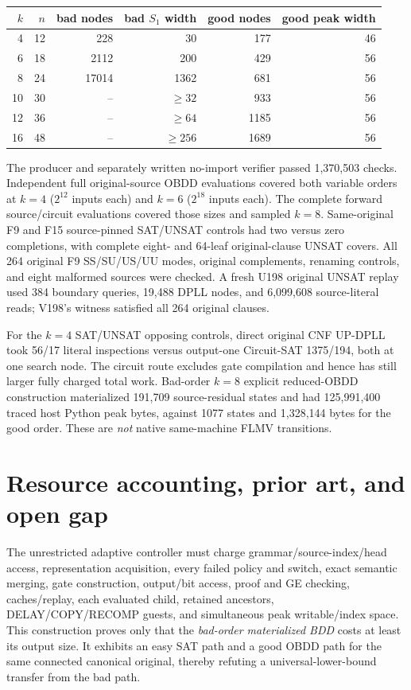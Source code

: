 \documentclass[11pt]{article}
\begin{document}
\begin{center}\begin{tabular}{rrrrrr}\toprule
$k$ & $n$ & bad nodes & bad $S_1$ width & good nodes & good peak width\\\midrule
4&12&228&30&177&46\\
6&18&2112&200&429&56\\
8&24&17014&1362&681&56\\
10&30&--&$\ge32$&933&56\\
12&36&--&$\ge64$&1185&56\\
16&48&--&$\ge256$&1689&56\\\bottomrule
\end{tabular}\end{center}

The producer and separately written no-import verifier passed 1,370,503 checks. Independent full original-source OBDD evaluations covered both variable orders at $k=4$ ($2^{12}$ inputs each) and $k=6$ ($2^{18}$ inputs each). The complete forward source/circuit evaluations covered those sizes and sampled $k=8$. Same-original F9 and F15 source-pinned SAT/UNSAT controls had two versus zero completions, with complete eight- and 64-leaf original-clause UNSAT covers. All 264 original F9 SS/SU/US/UU modes, original complements, renaming controls, and eight malformed sources were checked. A fresh U198 original UNSAT replay used 384 boundary queries, 19,488 DPLL nodes, and 6,099,608 source-literal reads; V198's witness satisfied all 264 original clauses.

For the $k=4$ SAT/UNSAT opposing controls, direct original CNF UP-DPLL took 56/17 literal inspections versus output-one Circuit-SAT 1375/194, both at one search node. The circuit route excludes gate compilation and hence has still larger fully charged total work. Bad-order $k=8$ explicit reduced-OBDD construction materialized 191,709 source-residual states and had 125,991,400 traced host Python peak bytes, against 1077 states and 1,328,144 bytes for the good order. These are \emph{not} native same-machine FLMV transitions.

\section{Resource accounting, prior art, and open gap}
The unrestricted adaptive controller must charge grammar/source-index/head access, representation acquisition, every failed policy and switch, exact semantic merging, gate construction, output/bit access, proof and GE checking, caches/replay, each evaluated child, retained ancestors, DELAY/COPY/RECOMP guests, and simultaneous peak writable/index space. This construction proves only that the \emph{bad-order materialized BDD} costs at least its output size. It exhibits an easy SAT path and a good OBDD path for the same connected canonical original, thereby refuting a universal-lower-bound transfer from the bad path.
\end{document}
